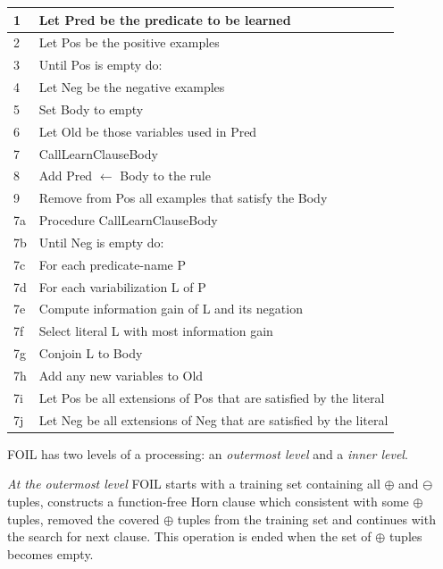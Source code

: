 \documentclass{scrartcl}
\begin{document}
\begin{tabular}{|l|l|} %
  \hline
  1 & Let Pred be the predicate to be learned  \\
  \hline
  2 & Let Pos be the positive examples  \\
  \hline
  3 & Until Pos is empty do:  \\
  \hline
  4 &   \qquad Let Neg be the negative examples \\
  \hline
  5 &   \qquad Set Body to empty \\
  \hline
  6 &   \qquad Let Old be those variables used in Pred \\
  \hline
  7 &   \qquad CallLearnClauseBody \\
  \hline
  8 &   \qquad Add Pred $\leftarrow$ Body to the rule \\
  \hline
  9 &   \qquad Remove from Pos all examples that satisfy the Body \\
  \hline
    7a & Procedure CallLearnClauseBody  \\
  \hline
  7b & \qquad Until Neg is empty do:  \\
  \hline
  7c & \qquad\qquad For each predicate-name P  \\
  \hline
  7d & \qquad\qquad For each variabilization L of P  \\
  \hline
  7e & \qquad\qquad Compute information gain of L and its negation \\
  \hline
  7f & \qquad\qquad Select literal L with most information gain \\
  \hline
  7g & \qquad\qquad Conjoin L to Body  \\
  \hline
  7h & \qquad\qquad Add any new variables to Old  \\
  \hline
  7i & \qquad\qquad Let Pos be all extensions of Pos that are satisfied by the literal \\
  \hline
  7j & \qquad\qquad Let Neg be all extensions of Neg that are satisfied by the literal  \\
  \hline

 \end{tabular}

\vspace{6pt}

FOIL has two levels of a processing: an \emph{outermost level} and a \emph{inner level}.

\emph{At the outermost level} FOIL starts with a training set containing
all $\oplus$ and $\ominus$ tuples,
 constructs a function-free Horn clause which consistent with some $\oplus$ tuples,
removed the covered $\oplus$ tuples from the training set
and continues with the search for next clause.
This operation is ended when the set of $\oplus$ tuples becomes empty.
\end{document}
